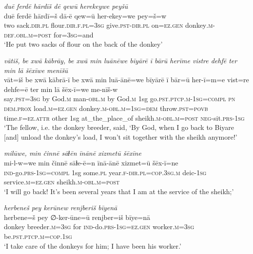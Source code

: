 \ea \label{HB.61}
\textit{duē ferdē hārdīš dē qewū herekeywe peyšū} \\ 
\gll duē ferdē hārdī=š dā-ē qew=ū her-ekey=we pey=š=w \\ 
 two sack\textsc{.dir}\textsc{.pl} flour\textsc{.dir}\textsc{\textsc{.f}}\textsc{.pl}\textsc{=3sg} give\textsc{.pst}\textsc{-dir}\textsc{.pl} on\textsc{=ez}\textsc{.gen} donkey\textsc{.m}\textsc{-def}\textsc{.obl}\textsc{.m}\textsc{=\textsc{post}} for\textsc{=3sg}=and \\ 
\glt `He put two sacks of flour on the back of the donkey'
\z 
 
\ea \label{HB.67}
\textit{vātiš, be xwā kābrāy, be xwā min luānēwe bīyārē ī bārū herīme vistre dehfē ter min lā šēxīwe menīšū} \\ 
\gll vāt=iš be xwā kābrā-ī be xwā min luā-ānē=we bīyārē ī bār=ū her-ī=m=e vist=re dehfe=ē ter min lā šēx-ī=we me-nīš-w \\ 
 say\textsc{.pst}\textsc{=3sg} by God\textsc{.m} man\textsc{-obl}\textsc{.m} by God\textsc{.m} 1sg go\textsc{.pst}\textsc{.ptcp}\textsc{.m}\textsc{-1sg}\textsc{=\textsc{compl}} \textsc{pn} \textsc{dem.prox} load\textsc{.m}\textsc{=ez}\textsc{.gen} donkey\textsc{.m}\textsc{-obl}\textsc{.m}\textsc{=1sg}\textsc{=dem} throw\textsc{.pst}\textsc{=\textsc{povb}} time\textsc{\textsc{.f}}\textsc{=ez}.\textsc{attr} other 1sg at\_the\_place\_of sheikh\textsc{.m}\textsc{-obl}\textsc{.m}\textsc{=\textsc{post}} \textsc{neg-}sit\textsc{.prs}\textsc{-1sg} \\ 
\glt `The fellow, i.e. the donkey breeder, said, ‘By God, when I go back to Biyare [and] unload the donkey’s load, I won’t sit together with the sheikh anymore!'
\z 
 
\ea \label{HB.68}
\textit{milūwe, min činnē sāɫēn īnānē xizmetū šēxīne} \\ 
\gll mi-l-w=we min činnē sāɫe-ē=n īnā-ānē xizmet=ū šēx-ī=ne \\ 
 \textsc{ind-}go\textsc{.prs}\textsc{-1sg}\textsc{=\textsc{compl}} 1sg some\textsc{.pl} year\textsc{\textsc{.f}}\textsc{-dir}\textsc{.pl}\textsc{=cop}\textsc{.3sg}\textsc{.m} deic\textsc{-1sg} service\textsc{.m}\textsc{=ez}\textsc{.gen} sheikh\textsc{.m}\textsc{-obl}\textsc{.m}\textsc{=\textsc{post}} \\ 
\glt `I will go back! It’s been several years that I am at the service of the sheikh;'
\z 
 
\ea \label{HB.69}
\textit{herbeneš pey kerūnew renjberiš bīyenā} \\ 
\gll herbene=š pey ∅-ker-ūne=ū renjber=iš bīye=nā \\ 
 donkey breeder\textsc{.m}\textsc{=3sg} for \textsc{ind-}do\textsc{.prs}\textsc{-1sg}\textsc{=ez}\textsc{.gen} worker\textsc{.m}\textsc{=3sg} be\textsc{.pst}\textsc{.ptcp}\textsc{.m}\textsc{=cop}\textsc{.1sg} \\ 
\glt `I take care of the donkeys for him; I have been his worker.'
\z 
 

